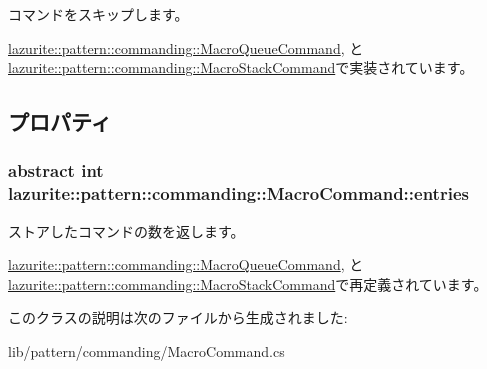 コマンドをスキップします。 

\hyperlink{classlazurite_1_1pattern_1_1commanding_1_1_macro_queue_command_af5e1197135ed072c1be8c9337949e12d}{lazurite::pattern::commanding::MacroQueueCommand}, と \hyperlink{classlazurite_1_1pattern_1_1commanding_1_1_macro_stack_command_a6c2b7d10e92b11b774b2fcf0365f6a04}{lazurite::pattern::commanding::MacroStackCommand}で実装されています。

\subsection{プロパティ}
\hypertarget{classlazurite_1_1pattern_1_1commanding_1_1_macro_command_ad07b059cd5dce67ac04b21290c29e625}{
\subsubsection[{entries}]{\setlength{\rightskip}{0pt plus 5cm}abstract int lazurite::pattern::commanding::MacroCommand::entries}}
\label{classlazurite_1_1pattern_1_1commanding_1_1_macro_command_ad07b059cd5dce67ac04b21290c29e625}


ストアしたコマンドの数を返します。 

\hyperlink{classlazurite_1_1pattern_1_1commanding_1_1_macro_queue_command_a9537c221d8cf19dbb5de28aafb334a70}{lazurite::pattern::commanding::MacroQueueCommand}, と \hyperlink{classlazurite_1_1pattern_1_1commanding_1_1_macro_stack_command_afdf7dd04a8e9c8ecf69c48af762e23cd}{lazurite::pattern::commanding::MacroStackCommand}で再定義されています。

このクラスの説明は次のファイルから生成されました:\begin{DoxyCompactItemize}
\item 
lib/pattern/commanding/MacroCommand.cs\end{DoxyCompactItemize}
